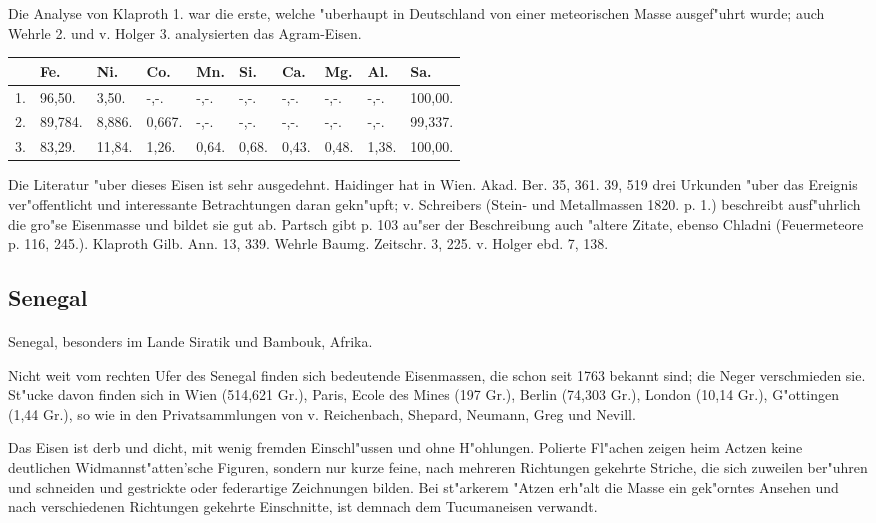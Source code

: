 \documentclass[a4paper, 11pt, oneside]{article}
\begin{document}
Die Analyse von Klaproth 1. war die erste, welche "uberhaupt in Deutschland von einer meteorischen Masse ausgef"uhrt wurde; auch Wehrle 2. und v. Holger 3. analysierten das Agram-Eisen.
\begin{table}[H]
    \centering
    \begin{tabular}{p{3mm} l l l l p{5mm} p{5mm} p{5mm} l l}
         & Fe. & Ni. & Co. & Mn. & Si. & Ca. & Mg. & Al. & Sa. \\ \hline
        1. & 96,50. & 3,50. & -,-. & -,-. & -,-. & -,-. & -,-. & -,-. & 100,00. \\
        2. & 89,784. & 8,886. & 0,667. & -,-. & -,-. & -,-. & -,-. & -,-. & 99,337. \\
        3. & 83,29. & 11,84. & 1,26. & 0,64. & 0,68. & 0,43. & 0,48. & 1,38. & 100,00. \\
    \end{tabular}
\end{table}

\footnotesize
Die Literatur "uber dieses Eisen ist sehr ausgedehnt. Haidinger hat in Wien. Akad. Ber. 35, 361. 39, 519 drei Urkunden "uber das Ereignis ver"offentlicht und interessante Betrachtungen daran gekn"upft; v. Schreibers (Stein- und Metallmassen 1820. p. 1.) beschreibt ausf"uhrlich die gro"se Eisenmasse und bildet sie gut ab. Partsch gibt p. 103 au"ser der Beschreibung auch "altere Zitate, ebenso Chladni (Feuermeteore p. 116, 245.). Klaproth Gilb. Ann. 13, 339. Wehrle Baumg. Zeitschr. 3, 225. v. Holger ebd. 7, 138.

\subsection{Senegal}
\normalsize
\paragraph{}
Senegal, besonders im Lande Siratik und Bambouk, Afrika.

Nicht weit vom rechten Ufer des Senegal finden sich bedeutende Eisenmassen, die schon seit 1763 bekannt sind; die Neger verschmieden sie. St"ucke davon finden sich in Wien (514,621 Gr.), Paris, Ecole des Mines (197 Gr.), Berlin (74,303 Gr.), London (10,14 Gr.), G"ottingen (1,44 Gr.), so wie in den Privatsammlungen von v. Reichenbach, Shepard, Neumann, Greg und Nevill.

Das Eisen ist derb und dicht, mit wenig fremden Einschl"ussen und ohne H"ohlungen. Polierte Fl"achen zeigen heim Actzen keine deutlichen Widmannst"atten'sche Figuren, sondern nur kurze feine, nach mehreren Richtungen gekehrte Striche, die sich zuweilen ber"uhren und schneiden und gestrickte oder federartige Zeichnungen bilden. Bei st"arkerem "Atzen erh"alt die Masse ein gek"orntes Ansehen und nach verschiedenen Richtungen gekehrte Einschnitte, ist demnach dem Tucumaneisen verwandt.
\end{document}
